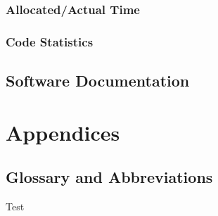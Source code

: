 \documentclass[a4paper,parskip=full]{scrreprt}
\begin{document}
\section{Allocated/Actual Time}
\section{Code Statistics}


\chapter{Software Documentation}



\part{Appendices}


\chapter{Glossary and Abbreviations}

Test \citep{yapproach}

\renewcommand{\bibname}{\chapter{Literature and Sources}}


\end{document}
